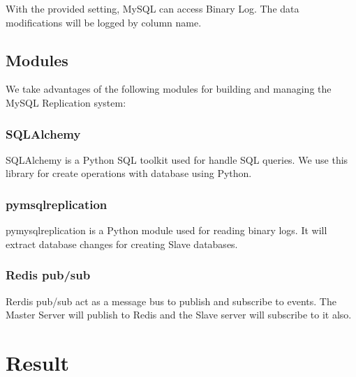 \documentclass[a4paper,12pt]{report}
\begin{document}
With the provided setting, MySQL can access Binary Log. The data modifications will be logged by column name.

\subsection{Modules}
We take advantages of the following modules for building and managing the MySQL Replication system:
\subsubsection{SQLAlchemy}
SQLAlchemy is a Python SQL toolkit used for handle SQL queries. We use this library for create operations with database using Python.

\subsubsection{pymsqlreplication}
pymysqlreplication is a Python module used for reading binary logs. It will extract database changes for creating Slave databases. 

\subsubsection{Redis pub/sub}
Rerdis pub/sub act as a message bus to publish and subscribe to events. The Master Server will publish to Redis and the Slave server will subscribe to it also.

\newpage
\section{\bfseries Result}
\fontsize{13}{16}\selectfont
\end{document}
